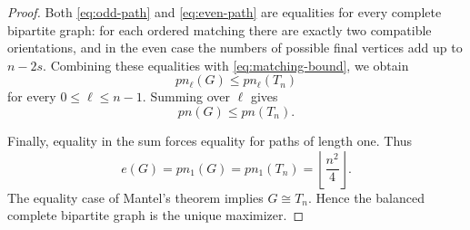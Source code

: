 \documentclass[a4paper,11pt]{article}
\newcommand{\pn}{pn}
\begin{document}
\begin{proof}
Both \eqref{eq:odd-path} and \eqref{eq:even-path} are equalities for
every complete bipartite graph: for each ordered matching there are
exactly two compatible orientations, and in the even case the numbers
of possible final vertices add up to $n-2s$. Combining these
equalities with \eqref{eq:matching-bound}, we obtain
\[
        \pn_\ell(G)\leq\pn_\ell(T_n)
\]
for every $0\leq\ell\leq n-1$. Summing over $\ell$ gives
\[
        \pn(G)\leq\pn(T_n).
\]

Finally, equality in the sum forces equality for paths of length one.
Thus
\[
        e(G)=\pn_1(G)=\pn_1(T_n)
             =\left\lfloor\frac{n^2}{4}\right\rfloor.
\]
The equality case of Mantel's theorem implies $G\cong T_n$. Hence the
balanced complete bipartite graph is the unique maximizer.
\end{proof}




% 
% 
\end{document}
